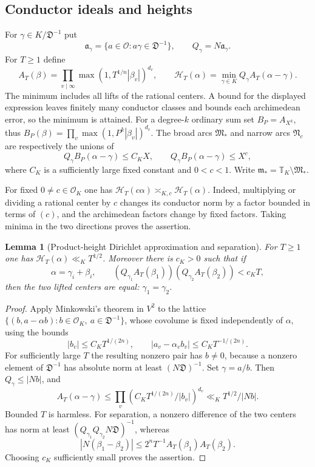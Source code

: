 \documentclass[11pt]{amsart}
\newtheorem{lemma}[theorem]{Lemma}
\theoremstyle{definition}
\numberwithin{equation}{section}
\begin{document}
\subsection{Conductor ideals and heights}
For $\gamma\in K/\mathfrak D^{-1}$ put
\[
 \mathfrak a_\gamma=\{a\in\mathcal O:a\gamma\in\mathfrak D^{-1}\},
 \qquad Q_\gamma=N\mathfrak a_\gamma.
\]
For $T\ge1$ define
\[
 A_T(\beta)=\prod_{v\mid\infty}\max(1,T^{1/n}|\beta_v|)^{d_v},
 \qquad
 \mathcal H_T(\alpha)=\min_{\gamma\in K}
              Q_\gamma A_T(\alpha-\gamma).
\]
The minimum includes all lifts of the rational centers. A bound
for the displayed expression leaves finitely many conductor classes
and bounds each archimedean error, so the minimum is attained.
For a degree-$k$ ordinary sum set $B_P=A_{X^k}$, thus
$B_P(\beta)=\prod_v\max(1,P^k|\beta_v|)^{d_v}$.
The broad arcs $\mathfrak M_*$ and narrow arcs $\mathfrak N_c$
are respectively the unions of
\[
 Q_\gamma B_P(\alpha-\gamma)\le C_KX,
 \qquad Q_\gamma B_P(\alpha-\gamma)\le X^c,
\]
where $C_K$ is a sufficiently large fixed constant and $0<c<1$.
Write $\mathfrak m_*=\mathbb T_K\setminus\mathfrak M_*$.

For fixed $0\ne c\in\mathcal O_K$ one has
$\mathcal H_T(c\alpha)\asymp_{K,c}\mathcal H_T(\alpha)$.
Indeed, multiplying or dividing a rational center by $c$ changes
its conductor norm by a factor bounded in terms of $(c)$, and
the archimedean factors change by fixed factors. Taking minima
in the two directions proves the assertion.

\begin{lemma}[Product-height Dirichlet approximation and separation]
\label{lem:g789-height}
For $T\ge1$ one has $\mathcal H_T(\alpha)\ll_K T^{1/2}$.
Moreover there is $c_K>0$ such that if
\[
 \alpha=\gamma_i+\beta_i,\qquad
 (Q_{\gamma_1}A_T(\beta_1))
 (Q_{\gamma_2}A_T(\beta_2))<c_KT,
\]
then the two lifted centers are equal: $\gamma_1=\gamma_2$.
\end{lemma}
\begin{proof}
Apply Minkowski's theorem in $V^2$ to the lattice
$\{(b,a-\alpha b):b\in\mathcal O_K,\ a\in\mathfrak D^{-1}\}$,
whose covolume is fixed independently of $\alpha$, using the bounds
\[
 |b_v|\le C_KT^{1/(2n)},\qquad
 |a_v-\alpha_vb_v|\le C_KT^{-1/(2n)}.
\]
For sufficiently large $T$ the resulting nonzero pair has $b\ne0$,
because a nonzero element of $\mathfrak D^{-1}$ has absolute norm
at least $(N\mathfrak D)^{-1}$. Set $\gamma=a/b$.
Then $Q_\gamma\le|Nb|$, and
\[
 A_T(\alpha-\gamma)
 \le \prod_v(C_KT^{1/(2n)}/|b_v|)^{d_v}
 \ll_K T^{1/2}/|Nb|.
\]
Bounded $T$ is harmless. For separation, a nonzero difference of the
two centers has norm at least
$(Q_{\gamma_1}Q_{\gamma_2}N\mathfrak D)^{-1}$, whereas
\[
 |N(\beta_1-\beta_2)|\le2^nT^{-1}A_T(\beta_1)A_T(\beta_2).
\]
Choosing $c_K$ sufficiently small proves the assertion.
\end{proof}
\end{document}
